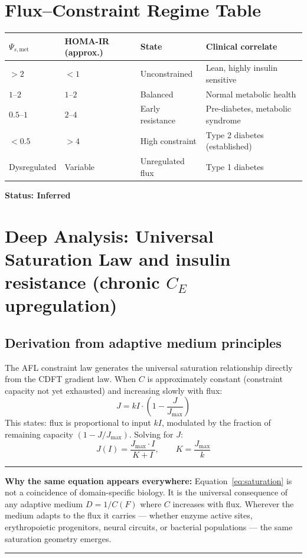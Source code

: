 \documentclass[11pt]{article}
\newcommand{\Jmax}{J_{\max}}
\newenvironment{corebox}{\begin{center}\begin{minipage}{0.95\linewidth}\hrule\vspace{0.5em}}{\vspace{0.5em}\hrule\end{minipage}\end{center}}
\begin{document}
\section{Flux--Constraint Regime Table}

\begin{center}
\begin{tabular}{llll}
\toprule
$\Psi_{s,\mathrm{met}}$ & HOMA-IR (approx.) & State & Clinical correlate \\
\midrule
$> 2$ & $< 1$ & Unconstrained & Lean, highly insulin sensitive \\
$1$--$2$ & $1$--$2$ & Balanced & Normal metabolic health \\
$0.5$--$1$ & $2$--$4$ & Early resistance & Pre-diabetes, metabolic syndrome \\
$< 0.5$ & $> 4$ & High constraint & Type 2 diabetes (established) \\
Dysregulated & Variable & Unregulated flux & Type 1 diabetes \\
\bottomrule
\end{tabular}
\end{center}

\textbf{Status: Inferred}


\section{Deep Analysis: Universal Saturation Law and insulin resistance (chronic $C_E$ upregulation)}
\subsection{Derivation from adaptive medium principles}

The AFL constraint law generates the universal saturation relationship directly from the CDFT gradient law. When $C$ is approximately constant (constraint capacity not yet exhausted) and increasing slowly with flux:
\begin{equation}
J = kI \cdot \left(1 - \frac{J}{\Jmax}\right)
\label{eq:feedback}
\end{equation}
This states: flux is proportional to input $kI$, modulated by the fraction of remaining capacity $(1 - J/\Jmax)$. Solving for $J$:
\begin{equation}
J(I) = \frac{\Jmax \cdot I}{K + I}, \qquad K = \frac{\Jmax}{k}
\label{eq:saturation}
\end{equation}

\begin{corebox}
\textbf{Why the same equation appears everywhere:} Equation~\eqref{eq:saturation} is not a coincidence of domain-specific biology. It is the universal consequence of any adaptive medium $D = 1/C(F)$ where $C$ increases with flux. Wherever the medium adapts to the flux it carries --- whether enzyme active sites, erythropoietic progenitors, neural circuits, or bacterial populations --- the same saturation geometry emerges.
\end{corebox}
\end{document}
